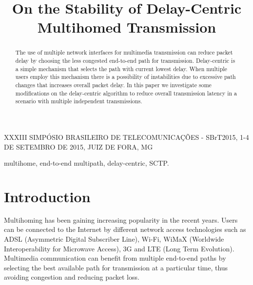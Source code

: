 \documentclass[letterpaper,10pt,oneside,conference,final]{sbrt2015}
\begin{document}
  \IEEEoverridecommandlockouts

  \title{On the Stability of Delay-Centric Multihomed Transmission}
  \author
  {
  }
  \maketitle
  
  
   {XXXIII SIMPÓSIO BRASILEIRO DE TELECOMUNICAÇÕES - SBrT2015, 1-4 DE SETEMBRO DE 2015, JUIZ DE FORA, MG}

  \begin{abstract}
    The use of multiple network interfaces for multimedia transmission can reduce packet delay by choosing the less congested end-to-end path for transmission. Delay-centric is a simple mechanism that selects the path with current lowest delay. When multiple users employ this mechanism there is a possibility of instabilities due to excessive path changes that increases overall packet delay. In this paper we investigate some modifications on the delay-centric algorithm to reduce overall transmission latency in a scenario with multiple independent transmissions.
  \end{abstract}

  \begin{keywords}
    multihome, end-to-end multipath, delay-centric, SCTP.
  \end{keywords}


  \section{Introduction}

  Multihoming has been gaining increasing popularity in the recent years. Users can be connected to the Internet by different network access technologies such as ADSL (Asymmetric Digital Subscriber Line), Wi-Fi, WiMaX (Worldwide Interoperability for Microwave Access), 3G and LTE (Long Term Evolution). Multimedia communication can benefit from multiple end-to-end paths by selecting the best available path for transmission at a particular time, thus avoiding congestion and reducing packet loss.
\end{document}
